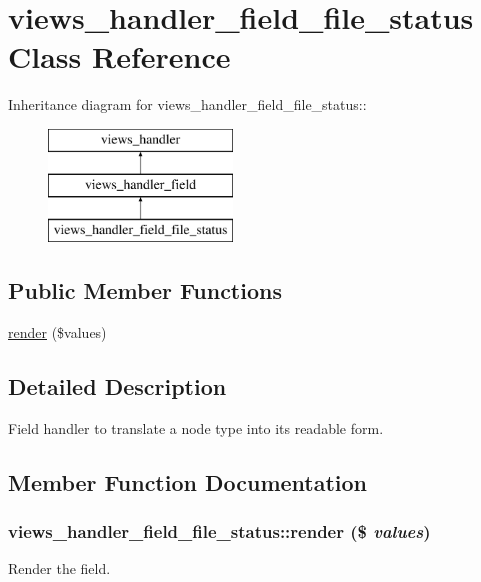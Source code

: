 \hypertarget{classviews__handler__field__file__status}{
\section{views\_\-handler\_\-field\_\-file\_\-status Class Reference}
\label{classviews__handler__field__file__status}
}
Inheritance diagram for views\_\-handler\_\-field\_\-file\_\-status::\begin{figure}[H]
\begin{center}
\leavevmode
\includegraphics[height=3cm]{classviews__handler__field__file__status}
\end{center}
\end{figure}
\subsection*{Public Member Functions}
\begin{DoxyCompactItemize}
\item 
\hyperlink{classviews__handler__field__file__status_aead1c1405c8a5ecdede4a455ed4d6015}{render} (\$values)
\end{DoxyCompactItemize}


\subsection{Detailed Description}
Field handler to translate a node type into its readable form. 

\subsection{Member Function Documentation}
\hypertarget{classviews__handler__field__file__status_aead1c1405c8a5ecdede4a455ed4d6015}{
\subsubsection[{render}]{\setlength{\rightskip}{0pt plus 5cm}views\_\-handler\_\-field\_\-file\_\-status::render (\$ {\em values})}}
\label{classviews__handler__field__file__status_aead1c1405c8a5ecdede4a455ed4d6015}
Render the field.


